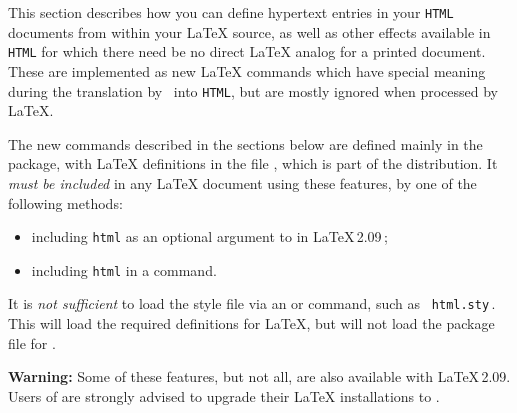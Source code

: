 \startdocument
%
\label{sec:hyp}

\noindent
This {section} describes how you can define hypertext 
entries in your \texttt{HTML} documents from within your \LaTeX{} source,
as well as other effects available in \texttt{HTML} for which
there need be no direct \LaTeX{} analog for a printed document.
These are implemented as new \LaTeX{} commands which have special 
meaning during the translation by \latextohtml\ into \texttt{HTML}, 
but are mostly ignored when processed by \LaTeX.

%
\html{\\}%
The new commands described in the sections 
below are defined mainly in the  package,
with \LaTeX{} definitions in the file ,
which is part of the \latextohtml{} distribution. 
It \emph{must be included} in any \LaTeX{} document using these features, 
by one of the following methods:

\begin{itemize}%
\item including \texttt{html} as an optional argument 
to  in \LaTeX\,2.09\,;
\item including \texttt{html} in a \LaTeXe{}  command.
\end{itemize}

\noindent
It is \emph{not sufficient} to load the style file via an  or
 command, such as \verb| html.sty|\,.
This will load the required definitions for \LaTeX, but will not load
the  package file for \latextohtml.

\smallskip\noindent
\textbf{Warning: } Some of these features, but not all, are also available
with \LaTeX{}\,2.09.\html{\\}
Users of \latextohtml{} are strongly advised to upgrade
their \LaTeX{} installations to \LaTeXe{}. 

